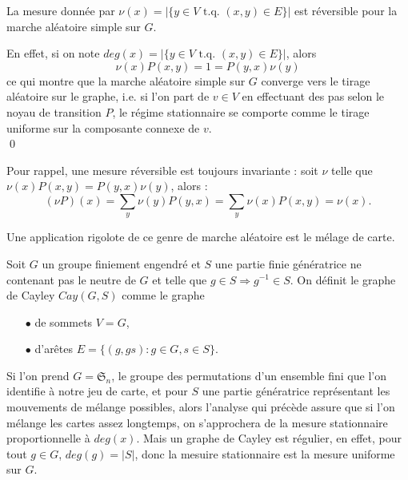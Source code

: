 \begin{prop}
La mesure donnée par $\nu(x)= |\{ y \in V \text{ t.q. } (x,y)\in E\}|$ est réversible pour la marche aléatoire simple sur $G$.
\end{prop}

\begin{dem}
En effet, si on note $deg(x) =|\{ y \in V \text{ t.q. } (x,y)\in E\}|$, alors 
\[\nu(x) P(x,y) = 1 = P(y,x)\nu(y)\]
ce qui montre que la marche aléatoire simple sur $G$ converge vers le tirage aléatoire sur le graphe, i.e. si l'on part de $v\in V$ en effectuant des pas selon le noyau de transition $P$, le régime stationnaire se comporte comme le tirage uniforme sur la composante connexe de $v$.\\
\qed
\end{dem}

Pour rappel, une mesure réversible est toujours invariante : soit $\nu$ telle que $\nu(x) P(x,y) = P(y,x)\nu(y)$, alors :
\[(\nu P )(x) = \sum_{y} \nu(y)P(y,x) = \sum_y \nu(x)P(x,y) = \nu(x).\]

Une application rigolote de ce genre de marche aléatoire est le mélage de carte. \\
\begin{definition}
Soit $G$ un groupe finiement engendré et $S$ une partie finie génératrice ne contenant pas le neutre de $G$ et telle que $g\in S \Rightarrow g^{-1}\in S$. On définit le graphe de Cayley $Cay(G,S)$ comme le graphe 
\begin{itemize}
\item[$\bullet$] de sommets $V= G$,
\item[$\bullet$] d'arêtes $E = \{(g,gs) : g\in G, s\in S\}$. \\
\end{itemize} 

Si l'on prend $G = \mathfrak S_n$, le groupe des permutations d'un ensemble fini que l'on identifie à notre jeu de carte, et pour $S$ une partie génératrice représentant les mouvements de mélange possibles, alors l'analyse qui précède assure que si l'on mélange les cartes assez longtemps, on s'approchera de la mesure stationnaire proportionnelle à $deg(x)$. Mais un graphe de Cayley est régulier, en effet, pour tout $g\in G$, $deg(g)= |S|$, donc la mesuire stationnaire est la mesure uniforme sur $G$. 
\end{definition}



